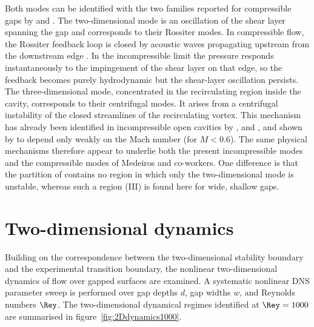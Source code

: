 \documentclass[lineno]{jfm}
\begin{document}
Both modes can be identified with the two families reported for compressible gaps by \citet{mathiasMedeiros2019,mathiasMedeiros2021} and \citet{aguirreMedeiros2024}. The two-dimensional mode is an oscillation of the shear layer spanning the gap and corresponds to their Rossiter modes. In compressible flow, the Rossiter feedback loop is closed by acoustic waves propagating upstream from the downstream edge \citep{rossiter1964}. In the incompressible limit the pressure responds instantaneously to the impingement of the shear layer on that edge, so the feedback becomes purely hydrodynamic but the shear-layer oscillation persists. The three-dimensional mode, concentrated in the recirculating region inside the cavity, corresponds to their centrifugal modes. It arises from a centrifugal instability of the closed streamlines of the recirculating vortex. This mechanism has already been identified in incompressible open cavities by \citet{meseguerGarrido2014}, \citet{deVicente2014} and \citet{Citro2015}, and shown by \citet{bresColonius2008} to depend only weakly on the Mach number (for $M<0.6$). The same physical mechanisms therefore appear to underlie both the present incompressible modes and the compressible modes of Medeiros and co-workers. One difference is that the partition of \citet{aguirreMedeiros2024} contains no region in which only the two-dimensional mode is unstable, whereas such a region (III) is found here for wide, shallow gaps.

\section{Two-dimensional dynamics}\label{sec:2Ddynamics}
Building on the correspondence between the two-dimensional stability boundary and the experimental transition boundary, the nonlinear two-dimensional dynamics of flow over gapped surfaces are examined. A systematic nonlinear \ac{DNS} parameter sweep is performed over gap depths $d$, gap widths $w$, and Reynolds numbers $\Rey$. The two-dimensional dynamical regimes identified at $\Rey=1000$ are summarised in figure~\ref{fig:2Ddynamics1000}.
\end{document}
